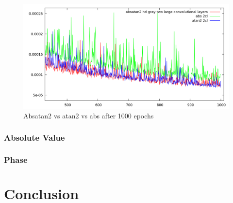\documentclass[11pt, a4paper]{article}
\begin{document}
\begin{figure}[htbp]
	\centering
	\includegraphics[width=\textwidth]{results/gabor_absatan2_vs_atan2_vs_abs.png}
	\caption{Absatan2 vs atan2 vs abs after 1000 epochs}
	\label{fig:gabor_absatan2_vs_atan2_vs_abs}
\end{figure}

\subsubsection{Absolute Value}
\subsubsection{Phase}



\section{Conclusion}
\label{sec:conclusion}

\newpage

\end{document}
